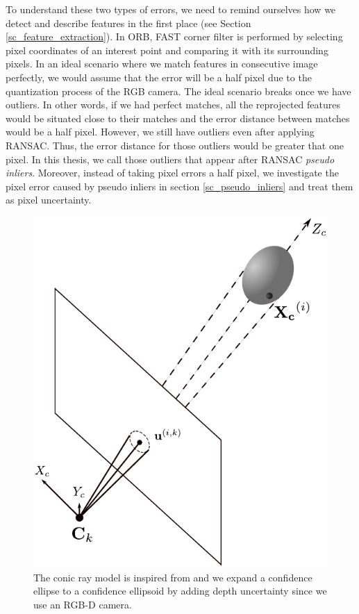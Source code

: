 \documentclass[a4paper]{report}
\numberwithin{figure}{section}
\begin{document}
To understand these two types of errors, we need to remind ourselves how we
detect and describe features in the first
place (see Section \ref{sc_feature_extraction}).  In ORB, FAST corner filter 
is performed by selecting pixel coordinates
of an interest point and comparing it with its surrounding pixels. In an ideal
scenario where we match features in consecutive image perfectly, we would
assume that the error will be a half pixel due to the quantization process of
the RGB camera.  The ideal scenario breaks once we have outliers. 
In other words, if we had perfect matches, all the reprojected features would
be situated close to their matches and the error distance between matches
would be a half pixel. However, we still have outliers even after applying
RANSAC. Thus, the error distance for those outliers would be greater that one
pixel.  In this thesis, we call those outliers that appear after RANSAC
\textit{pseudo inliers}. Moreover, instead of taking pixel errors a half pixel,
we investigate the pixel error caused by pseudo inliers in section
\ref{sc_pseudo_inliers} and treat them as pixel uncertainty.

\begin{figure}[H] \centering
\includegraphics[width=0.6\linewidth,natwidth=640,natheight=640]
{fig/drawings/conic_ray.pdf} \caption[The Conic Ray Error Model]{ The conic ray
model is inspired from \parencite{Sola2007a} and we expand a confidence 
ellipse 
to a
confidence ellipsoid by adding depth uncertainty since we use an RGB-D camera.}
\label{fig:conic_ray_3d_error_model} \end{figure}
\end{document}
